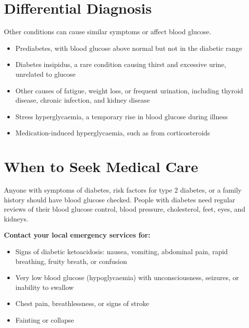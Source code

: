\section*{Differential Diagnosis}
Other conditions can cause similar symptoms or affect blood glucose.
\begin{itemize}
    \item Prediabetes, with blood glucose above normal but not in the diabetic range
    \item Diabetes insipidus, a rare condition causing thirst and excessive urine, unrelated to glucose
    \item Other causes of fatigue, weight loss, or frequent urination, including thyroid disease, chronic infection, and kidney disease
    \item Stress hyperglycaemia, a temporary rise in blood glucose during illness
    \item Medication-induced hyperglycaemia, such as from corticosteroids
\end{itemize}

\section*{When to Seek Medical Care}
Anyone with symptoms of diabetes, risk factors for type 2 diabetes, or a family history should have blood glucose checked. People with diabetes need regular reviews of their blood glucose control, blood pressure, cholesterol, feet, eyes, and kidneys.

\textbf{Contact your local emergency services for:}
\begin{itemize}
    \item Signs of diabetic ketoacidosis: nausea, vomiting, abdominal pain, rapid breathing, fruity breath, or confusion
    \item Very low blood glucose (hypoglycaemia) with unconsciousness, seizures, or inability to swallow
    \item Chest pain, breathlessness, or signs of stroke
    \item Fainting or collapse
\end{itemize}


